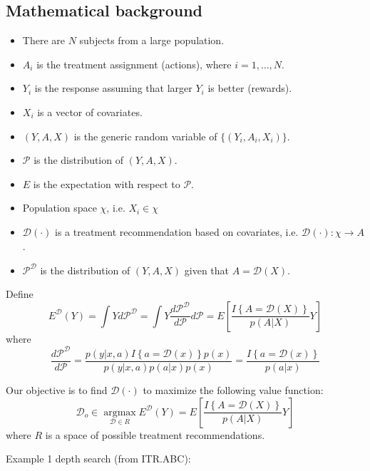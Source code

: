 \documentclass{article}
\begin{document}
\subsection{Mathematical background}
\begin{itemize}
\item There are $N$ subjects from a large population.
\item $A_i$ is the treatment assignment (actions), where $i = 1,\ldots,N$.
\item $Y_i$ is the response assuming that larger $Y_i$ is better (rewards).
\item $X_i$ is a vector of covariates.
\item $\left(Y , A, X\right)$ is the generic random variable of $\{\left(Y_i , A_i, X_i\right)\}$.
\item $\mathcal{P}$ is the distribution of $\left(Y , A, X\right)$.
\item $E$ is the expectation with respect to $\mathcal{P}$.
\item Population space $\chi$, i.e. ${X _i} \in \chi$
\item $\mathcal{D}\left(\cdot\right)$ is a treatment recommendation based on covariates, i.e.
$\mathcal{D}\left(\cdot\right) : \chi  \to A$.
\item $\mathcal{P^D}$ is the distribution of $\left(Y , A, X\right)$ given that $A = \mathcal{D}\left( X \right)$.
\end{itemize}

Define
\[{E^\mathcal{D}}\left( Y \right) = \int {Yd{\mathcal{P^D}}}  = \int {Y\frac{{d\mathcal{P^D}}}{{d\mathcal{P}}}d\mathcal{P} = E\left[ {\frac{{I\left\{ {A = \mathcal{D}\left( X \right)} \right\}}}{{p\left( {A|X} \right)}}Y} \right]} \]
where
\[\frac{{d\mathcal{P^D}}}{{d\mathcal{P}}} = \frac{{p\left( {y|x,a} \right)I\left\{ {a = \mathcal{D}\left( x \right)} \right\}p\left( x \right)}}{{p\left( {y|x,a} \right)p\left( {a|x} \right)p\left( x \right)}} = \frac{{I\left\{ {a = \mathcal{D}\left( x \right)} \right\}}}{{p\left( {a|x} \right)}}\]

Our objective is to find $\mathcal{D}\left(\cdot\right)$ to maximize the following value function:
\[{\mathcal{D}_o} \in \mathop {\arg \max }\limits_{\mathcal{D} \in R} {E^\mathcal{D}}\left( Y \right) = E\left[ {\frac{{I\left\{ {A = \mathcal{D}\left( X \right)} \right\}}}{{p\left( {A|X} \right)}}Y} \right]\]
where $R$ is a space of possible treatment recommendations.

Example 1 depth search (from ITR.ABC):
\end{document}
